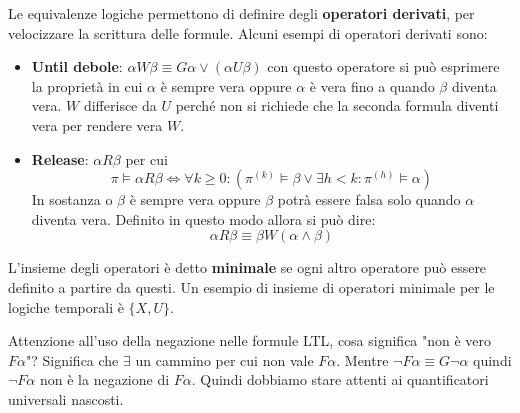 Le equivalenze logiche permettono di definire degli \textbf{operatori derivati},
per velocizzare la scrittura delle formule. Alcuni esempi di operatori derivati
sono:
\begin{itemize}
    \item \textbf{Until debole}: $\alpha W \beta \equiv G\alpha \lor
              (\alpha U \beta)$ con questo operatore si può esprimere la proprietà
          in cui $\alpha$ è sempre vera oppure $\alpha$ è vera fino a quando
          $\beta$ diventa vera. $W$ differisce da $U$ perché non si richiede che
          la seconda formula diventi vera per rendere vera $W$.
    \item \textbf{Release}: $\alpha R \beta$ per cui
          \begin{equation}
              \pi \vDash \alpha R \beta \iff \forall k \geq 0: (\pi^{(k)} \vDash
              \beta \lor \exists h < k: \pi^{(h)} \vDash \alpha)
          \end{equation}
          In sostanza o $\beta$ è sempre vera oppure $\beta$ potrà essere falsa
          solo quando $\alpha$ diventa vera. Definito in questo modo allora si
          può dire:
          \begin{equation}
              \alpha R \beta \equiv \beta W (\alpha \land \beta)
          \end{equation}
\end{itemize}
\begin{definizione}
    L'insieme degli operatori è detto \textbf{minimale} se ogni altro
    operatore può essere definito a partire da questi. Un esempio di insieme di
    operatori minimale per le logiche temporali è $\{X,U\}$.
\end{definizione}
Attenzione all'uso della negazione nelle formule LTL, cosa significa "non è vero
$F\alpha$"? Significa che $\exists$ un cammino per cui non vale $F\alpha$. Mentre
$\lnot F\alpha \equiv G\lnot \alpha$ quindi $\lnot F\alpha$ non è la negazione di
$F\alpha$. Quindi dobbiamo stare attenti ai quantificatori universali nascosti.

